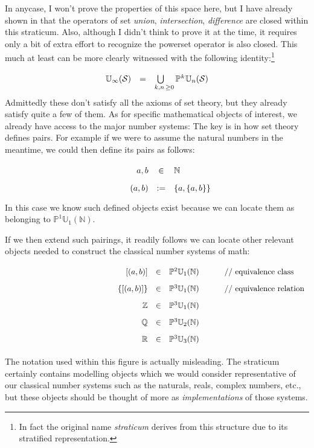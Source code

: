 \documentclass[twoside]{article}
\newcommand{\nthps}[2][P]{\ensuremath{\mathbb{#1}^{#2}}}
\newcommand{\nthus}[2][U]{\ensuremath{\mathbb{#1}_{#2}}}
\newcommand{\stratified}{\ensuremath{\mathbb{U}_\infty}}
\newcommand{\of}[1]{\ensuremath{(\mathcal{#1})}}
\newcommand{\ofbb}[1]{\ensuremath{(\mathbb{#1})}}
\newcommand{\tab}[1][1.125cm]{\hspace{#1}}
\newcommand{\col}[1][0ex]{& \hspace{#1}}
\newcommand{\cbox}[1]{\mbox{// #1}}
\begin{document}
In anycase, I won't prove the properties of this space here, but I have already shown in \cite{niksp} that the operators of set
\emph{union}, \emph{intersection}, \emph{difference} are closed within this straticum. Also, although I didn't think to prove it
at the time, it requires only a bit of extra effort to recognize the powerset operator is also closed. This much at least can
be more clearly witnessed with the following identity:\footnote{In fact the original name \emph{straticum} derives from this
structure due to its stratified representation.}
$$ \def\arraystretch{1.75}
\begin{array}{rrl}
\stratified\of{S}	& = \col[-2ex] \bigcup\limits_{\tab[2ex] k,n\,\ge 0}\nthps{\tab[0.1ex] k}\tab[0.1ex]\nthus{n}\of{S}	\\
\end{array} $$
Admittedly these don't satisfy all the axioms of set theory, but they already satisfy quite a few of them. As for specific
mathematical objects of interest, we already have access to the major number systems: The key is in how set theory defines
pairs. For example if we were to assume the natural numbers in the meantime, we could then define its pairs as follows:
$$ \def\arraystretch{1.75}
\tab \begin{array}{rcll}
a,b		& \in & \mathbb{N}									\\
(a,b)		& :=  & \{a, \{a,b\}\}									\\
\end{array} $$
In this case we know such defined objects exist because we can locate them as belonging to $ \nthps{1}\nthus{1}\ofbb{N} $.

If we then extend such pairings, it readily follows we can locate other relevant objects needed to construct the classical
number systems of math:
$$ \def\arraystretch{1.75}
\tab[4.75cm] \begin{array}{rcll}
{}[(a,b)]	& \in & \nthps{2}\nthus{1}\ofbb{N}	\col[5ex] \cbox{equivalence class}		\\
\{[(a,b)]\}	& \in & \nthps{3}\nthus{1}\ofbb{N}	\col[5ex] \cbox{equivalence relation}		\\
\mathbb{Z}	& \in & \nthps{3}\nthus{1}\ofbb{N}							\\
\mathbb{Q}	& \in & \nthps{3}\nthus{2}\ofbb{N}							\\
\mathbb{R}	& \in & \nthps{3}\nthus{3}\ofbb{N}							\\
\end{array} $$

The notation used within this figure is actually misleading. The straticum certainly contains modelling objects which we would
consider representative of our classical number systems such as the naturals, reals, complex numbers, etc., but these objects
should be thought of more as \emph{implementations} of those systems.
\end{document}
